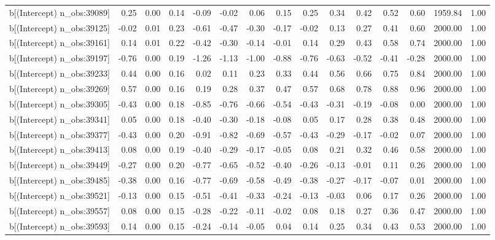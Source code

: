 \begin{table}[ht]
\begin{tabular}{rrrrrrrrrrrrrrr}
  b[(Intercept) n\_obs:39089] & 0.25 & 0.00 & 0.14 & -0.09 & -0.02 & 0.06 & 0.15 & 0.25 & 0.34 & 0.42 & 0.52 & 0.60 & 1959.84 & 1.00 \\ 
  b[(Intercept) n\_obs:39125] & -0.02 & 0.01 & 0.23 & -0.61 & -0.47 & -0.30 & -0.17 & -0.02 & 0.13 & 0.27 & 0.41 & 0.60 & 2000.00 & 1.00 \\ 
  b[(Intercept) n\_obs:39161] & 0.14 & 0.01 & 0.22 & -0.42 & -0.30 & -0.14 & -0.01 & 0.14 & 0.29 & 0.43 & 0.58 & 0.74 & 2000.00 & 1.00 \\ 
  b[(Intercept) n\_obs:39197] & -0.76 & 0.00 & 0.19 & -1.26 & -1.13 & -1.00 & -0.88 & -0.76 & -0.63 & -0.52 & -0.41 & -0.28 & 2000.00 & 1.00 \\ 
  b[(Intercept) n\_obs:39233] & 0.44 & 0.00 & 0.16 & 0.02 & 0.11 & 0.23 & 0.33 & 0.44 & 0.56 & 0.66 & 0.75 & 0.84 & 2000.00 & 1.00 \\ 
  b[(Intercept) n\_obs:39269] & 0.57 & 0.00 & 0.16 & 0.19 & 0.28 & 0.37 & 0.47 & 0.57 & 0.68 & 0.78 & 0.88 & 0.96 & 2000.00 & 1.00 \\ 
  b[(Intercept) n\_obs:39305] & -0.43 & 0.00 & 0.18 & -0.85 & -0.76 & -0.66 & -0.54 & -0.43 & -0.31 & -0.19 & -0.08 & 0.00 & 2000.00 & 1.00 \\ 
  b[(Intercept) n\_obs:39341] & 0.05 & 0.00 & 0.18 & -0.40 & -0.30 & -0.18 & -0.08 & 0.05 & 0.17 & 0.28 & 0.38 & 0.48 & 2000.00 & 1.00 \\ 
  b[(Intercept) n\_obs:39377] & -0.43 & 0.00 & 0.20 & -0.91 & -0.82 & -0.69 & -0.57 & -0.43 & -0.29 & -0.17 & -0.02 & 0.07 & 2000.00 & 1.00 \\ 
  b[(Intercept) n\_obs:39413] & 0.08 & 0.00 & 0.19 & -0.40 & -0.29 & -0.17 & -0.05 & 0.08 & 0.21 & 0.32 & 0.46 & 0.58 & 2000.00 & 1.00 \\ 
  b[(Intercept) n\_obs:39449] & -0.27 & 0.00 & 0.20 & -0.77 & -0.65 & -0.52 & -0.40 & -0.26 & -0.13 & -0.01 & 0.11 & 0.26 & 2000.00 & 1.00 \\ 
  b[(Intercept) n\_obs:39485] & -0.38 & 0.00 & 0.16 & -0.77 & -0.69 & -0.58 & -0.49 & -0.38 & -0.27 & -0.17 & -0.07 & 0.01 & 2000.00 & 1.00 \\ 
  b[(Intercept) n\_obs:39521] & -0.13 & 0.00 & 0.15 & -0.51 & -0.41 & -0.33 & -0.24 & -0.13 & -0.03 & 0.06 & 0.17 & 0.26 & 2000.00 & 1.00 \\ 
  b[(Intercept) n\_obs:39557] & 0.08 & 0.00 & 0.15 & -0.28 & -0.22 & -0.11 & -0.02 & 0.08 & 0.18 & 0.27 & 0.36 & 0.47 & 2000.00 & 1.00 \\ 
  b[(Intercept) n\_obs:39593] & 0.14 & 0.00 & 0.15 & -0.24 & -0.14 & -0.05 & 0.04 & 0.14 & 0.25 & 0.34 & 0.43 & 0.53 & 2000.00 & 1.00 \\ 

\end{tabular}
\end{table}
